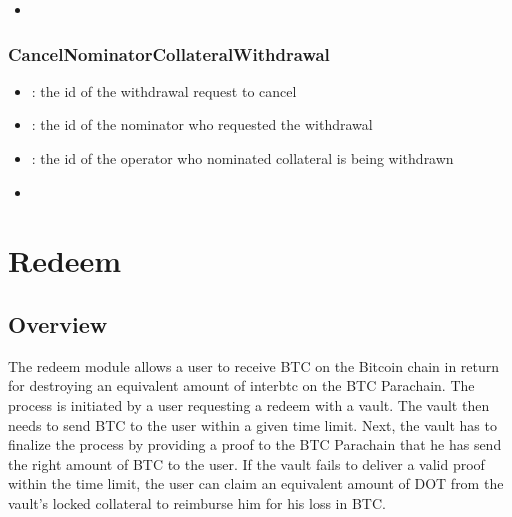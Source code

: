 \documentclass[a4paper,10pt,english]{sphinxmanual}
\begin{document}
\begin{itemize}
\item {} 
{\hyperref[\detokenize{spec/nomination:executenominatorwithdrawal}]{}}

\end{itemize}


\subsection{CancelNominatorCollateralWithdrawal}
\label{\detokenize{spec/nomination:cancelnominatorcollateralwithdrawal}}


\begin{itemize}
\item {} 
: the id of the withdrawal request to cancel

\item {} 
: the id of the nominator who requested the withdrawal

\item {} 
: the id of the operator who nominated collateral is being withdrawn

\end{itemize}

\begin{itemize}
\item {} 
{\hyperref[\detokenize{spec/nomination:cancelnominatorwithdrawal}]{}}

\end{itemize}


\chapter{Redeem}
\label{\detokenize{spec/redeem:redeem}}\label{\detokenize{spec/redeem:redeem-protocol}}\label{\detokenize{spec/redeem::doc}}

\section{Overview}
\label{\detokenize{spec/redeem:overview}}
The redeem module allows a user to receive BTC on the Bitcoin chain in return for destroying an equivalent amount of interbtc on the BTC Parachain. The process is initiated by a user requesting a redeem with a vault. The vault then needs to send BTC to the user within a given time limit. Next, the vault has to finalize the process by providing a proof to the BTC Parachain that he has send the right amount of BTC to the user. If the vault fails to deliver a valid proof within the time limit, the user can claim an equivalent amount of DOT from the vault’s locked collateral to reimburse him for his loss in BTC.
\end{document}
